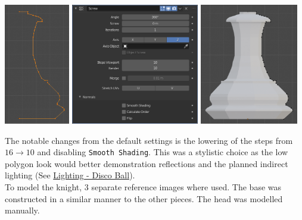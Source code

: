 \documentclass[11pt]{article}
\begin{document}
\begin{center}
\includegraphics[height=150pt]{Images/modelling piece inprogress.png}
\includegraphics[height=150pt]{Images/screw settings.png}
\includegraphics[height=150pt]{Images/pawn model.png}
\end{center}
The notable changes from the default settings is the lowering of the steps from
\(16 \to 10\) and disabling \texttt{Smooth Shading}. This was a stylistic choice as the
low polygon look would better demonstration reflections and the planned indirect
lighting (See \hyperref[sec:orgee3f3d9]{Lighting - Disco Ball}).\\

To model the knight, 3 separate reference images where used. The base was
constructed in a similar manner to the other pieces. The head was modelled
manually.
\end{document}
